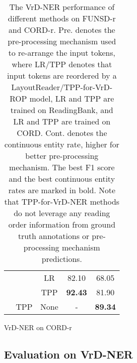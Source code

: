\documentclass[11pt]{article}
\begin{document}
\begin{table*}[t]
\begin{spacing}{1.19}
\begin{subtable}[h]{0.49\linewidth}
\begin{tabular}{c|c|c|cc}
         & & LR & 82.10 & 68.05 \\
         & & TPP & \textbf{92.43} & 81.90 \\
        \cline{2-5}
         & TPP & None & - & \textbf{89.34} \\
        \toprule
    \end{tabular}
    \caption{VrD-NER on CORD-r}    
\end{subtable}
\end{spacing}
\caption{The VrD-NER performance of different methods on FUNSD-r and CORD-r. 
Pre. denotes the pre-processing mechanism used to re-arrange the input tokens, where LR/TPP denotes that input tokens are reordered by a LayoutReader/TPP-for-VrD-ROP model, LR and TPP are trained on ReadingBank, and LR and TPP are trained on CORD. 
Cont. denotes the continuous entity rate, higher for better pre-processing mechanism. The best F1 score and the best continuous entity rates are marked in bold. 
Note that TPP-for-VrD-NER methods do not leverage any reading order information from ground truth annotations or pre-processing mechanism predictions. 
}
\label{tab:main}
\end{table*}

\subsection{Evaluation on VrD-NER}
\end{document}
